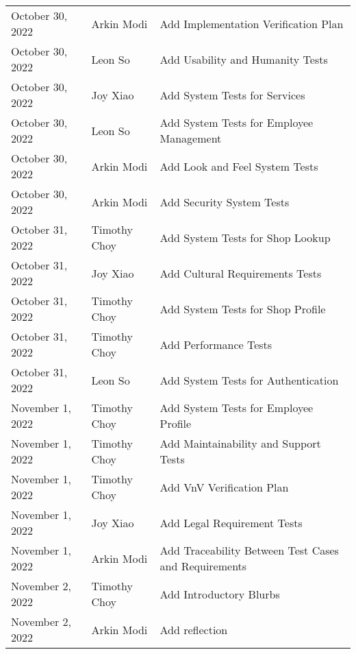 \documentclass[12pt, titlepage]{article}
\begin{document}
\begin{longtable}{p{} p{} p{}}
	October 30, 2022 & Arkin Modi            & Add Implementation Verification Plan                       \\
	October 30, 2022 & Leon So               & Add Usability and Humanity Tests                           \\
	October 30, 2022 & Joy Xiao              & Add System Tests for Services                              \\
	October 30, 2022 & Leon So               & Add System Tests for Employee Management                   \\
	October 30, 2022 & Arkin Modi            & Add Look and Feel System Tests                             \\
	October 30, 2022 & Arkin Modi            & Add Security System Tests                                  \\
	October 31, 2022 & Timothy Choy          & Add System Tests for Shop Lookup                           \\
	October 31, 2022 & Joy Xiao              & Add Cultural Requirements Tests                            \\
	October 31, 2022 & Timothy Choy          & Add System Tests for Shop Profile                          \\
	October 31, 2022 & Timothy Choy          & Add Performance Tests                                      \\
	October 31, 2022 & Leon So               & Add System Tests for Authentication                        \\
	November 1, 2022 & Timothy Choy          & Add System Tests for Employee Profile                      \\
	November 1, 2022 & Timothy Choy          & Add Maintainability and Support Tests                      \\
	November 1, 2022 & Timothy Choy          & Add VnV Verification Plan                                  \\
	November 1, 2022 & Joy Xiao              & Add Legal Requirement Tests                                \\
	November 1, 2022 & Arkin Modi            & Add Traceability Between Test Cases and Requirements       \\
	November 2, 2022 & Timothy Choy          & Add Introductory Blurbs                                    \\
	November 2, 2022 & Arkin Modi            & Add reflection                                             \\

\end{longtable}
\end{document}
